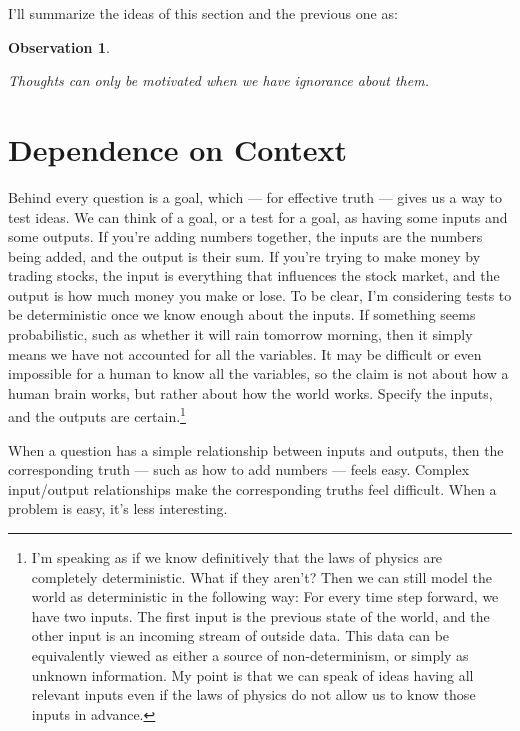 \documentclass[9pt, twoside]{book}
\newtheorem{obs}{Observation}
\theoremstyle{argtstyle}
\begin{document}

I'll summarize the ideas of this section and the previous one as:
\newcommand{\obsfive}{
    Thoughts can only be motivated when we have ignorance about them.
}
\begin{obs}\label{o5}
    \obsfive
\end{obs}

\section{Dependence on Context}

Behind every question is a goal, which --- for effective truth --- gives
us a way to test ideas.
We can think of a goal, or a test for a goal, as having some inputs
and some outputs.
If you're adding numbers together,
the inputs are the numbers being added, and
the output is their sum.
If you're trying to make money by trading stocks,
the input is everything
that influences the stock market,
and the output is how much
money you make or lose.
To be clear, I'm considering tests to be deterministic once we know enough
about the inputs.
If something seems probabilistic,
such as whether it will
rain tomorrow morning, then it simply means we have not accounted for all
the variables.
It may be difficult or even impossible for a human to know all
the variables, so the claim is not about how a human brain works, but rather
about how the world works.
Specify the inputs, and the outputs are certain.\footnote{I'm speaking as if we
know definitively that the laws of physics are completely deterministic. What if
they aren't? Then we can still model the world as deterministic in the following
way: For every time step forward, we have two inputs. The first input is the
previous state of the world, and the other input is an incoming stream of
outside data. This data can be equivalently viewed as either a source of
non-determinism, or simply as unknown information. My point is that we can speak
of
ideas having all relevant inputs even if the laws of physics do not allow us to
know those inputs in advance.}

When a question has a simple relationship between inputs and outputs, then the
corresponding truth --- such as how to add numbers --- feels easy. Complex
input/output relationships make the corresponding truths feel difficult.
When a problem is easy, it's less interesting.
\end{document}
